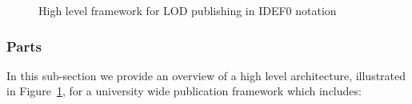 \begin{figure}[htbp]
\centering
{}
\caption[High level framework for LOD publishing]{High level framework for LOD publishing in IDEF0 notation}
\label{Fi:idef0}
\end{figure}
\subsubsection{Parts}
In this sub-section we provide an overview of a high level architecture, illustrated in Figure~\ref{Fi:idef0}, for a university wide publication framework which includes:

